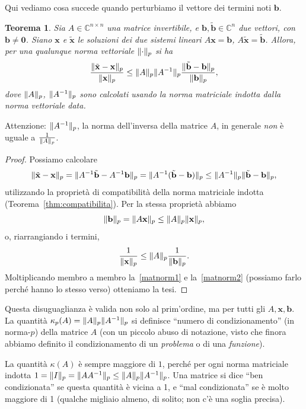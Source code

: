 \documentclass[a4paper]{report}
\DeclarePairedDelimiter{\norm}{\lVert}{\rVert}
\newtheorem{theorem}{Teorema}[chapter]
\theoremstyle{definition}
\theoremstyle{remark}
\newcommand{\x}{\mathbf{x}}
\renewcommand{\b}{\mathbf{b}}
\begin{document}
Qui vediamo cosa succede quando perturbiamo il vettore dei termini noti $\b$. 
\begin{theorem}
    Sia $A\in \mathbb{C}^{n\times n}$ una matrice invertibile, e $\b,\tilde{\b} \in \mathbb{C}^n$ due vettori, con $\b\neq \mathbf{0}$. Siano $\x$ e $\tilde{\x}$ le soluzioni dei due sistemi lineari $A\x=\b$, $A\tilde{\x}=\tilde{\b}$. Allora, per una qualunque norma vettoriale $\norm{\cdot}_p$ si ha
    \begin{equation} \label{conditionbound}
        \frac{\norm{\tilde{\x}-\x}_p}{\norm{\x}_p} \leq \norm{A}_p\norm{A^{-1}}_p \frac{\norm{\tilde{\b}-\b}_p}{\norm{\b}_p},
    \end{equation}
    dove $\norm{A}_p$, $\norm{A^{-1}}_p$ sono calcolati usando la norma matriciale indotta dalla norma vettoriale data.
\end{theorem}
Attenzione: $\norm{A^{-1}}_p$, la norma dell'inversa della matrice $A$, in generale \emph{non} è uguale a $\frac{1}{\norm{A}_p}$.
\begin{proof}
Possiamo calcolare
\begin{equation} \label{matnorm1}
    \norm{\tilde{\x}-\x}_p = \norm{A^{-1}\tilde{\b} - A^{-1}\b}_p = \norm{A^{-1}(\tilde{\b}-\b)}_p \leq  \norm{A^{-1}}_p\norm{\tilde{\b}-\b}_p,    
\end{equation}
utilizzando la proprietà di compatibilità della norma matriciale indotta (Teorema~\ref{thm:compatibilita}). Per la stessa proprietà abbiamo
\[
\norm{\b}_p = \norm{A \x}_p \leq \norm{A}_p\norm{\x}_p,
\]
o, riarrangiando i termini,
\begin{equation} \label{matnorm2}
    \frac{1}{\norm{\x}_p} \leq \norm{A}_p \frac{1}{\norm{\b}_p}.
\end{equation}
Moltiplicando membro a membro la~\eqref{matnorm1} e la~\eqref{matnorm2} (possiamo farlo perché hanno lo stesso verso) otteniamo la tesi.
\end{proof}

Questa disuguaglianza è valida non solo al prim'ordine, ma per tutti gli $A,\x,\b$. La quantità $\kappa_p(A) = \norm{A}_p\norm{A^{-1}}_p$ si definisce ``numero di condizionamento'' (in norma-$p$) della matrice $A$ (con un piccolo abuso di notazione, visto che finora abbiamo definito il condizionamento di un \emph{problema} o di una \emph{funzione}).

La quantità $\kappa(A)$ è sempre maggiore di $1$, perché per ogni norma matriciale indotta $1 = \norm{I}_p = \norm{AA^{-1}}_p \leq \norm{A}_p\norm{A^{-1}}_p$. Una matrice si dice ``ben condizionata'' se questa quantità è vicina a 1, e ``mal condizionata'' se è molto maggiore di 1 (qualche migliaio almeno, di solito; non c'è una soglia precisa).
\end{document}
